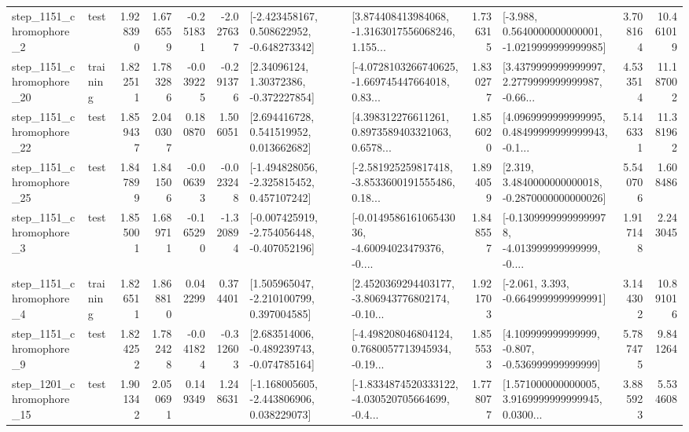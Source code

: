\begin{tabular}{llrrrrllrlrr}
  step\_1151\_chromophore\_2 &      test &      1.928390 &    1.676559 &     -0.251831 & -2.027637 &   [-2.423458167, 0.508622952, -0.648273342] &  [3.874408413984068, -1.3163017556068246, 1.155... &       1.736315 &  [-3.988, 0.5640000000000001, -1.0219999999999985] &            3.708164 &         10.461019 \\
 step\_1151\_chromophore\_20 &  training &      1.822511 &    1.783286 &     -0.039225 & -0.291376 &      [2.34096124, 1.30372386, -0.372227854] &  [-4.0728103266740625, -1.669745447664018, 0.83... &       1.830277 &  [3.4379999999999997, 2.2779999999999987, -0.66... &            4.533514 &         11.187002 \\
 step\_1151\_chromophore\_22 &      test &      1.859437 &    2.040307 &      0.180870 &  1.506051 &     [2.694416728, 0.541519952, 0.013662682] &  [4.398312276611261, 0.8973589403321063, 0.6578... &       1.856020 &  [4.0969999999999995, 0.48499999999999943, -0.1... &            5.146331 &         11.381962 \\
 step\_1151\_chromophore\_25 &      test &      1.847899 &    1.841506 &     -0.006393 & -0.023248 &   [-1.494828056, -2.325815452, 0.457107242] &  [-2.581925259817418, -3.8533600191555486, 0.18... &       1.894059 &   [2.319, 3.4840000000000018, -0.2870000000000026] &            5.540706 &          1.608486 \\
  step\_1151\_chromophore\_3 &      test &      1.855001 &    1.689711 &     -0.165290 & -1.320894 &  [-0.007425919, -2.754056448, -0.407052196] &  [-0.014958616106543036, -4.60094023479376, -0.... &       1.848557 &  [-0.13099999999999978, -4.013999999999999, -0.... &            1.917148 &          2.243045 \\
  step\_1151\_chromophore\_4 &  training &      1.826511 &    1.868810 &      0.042299 &  0.374401 &    [1.505965047, -2.210100799, 0.397004585] &  [2.4520369294403177, -3.806943776802174, -0.10... &       1.921703 &               [-2.061, 3.393, -0.6649999999999991] &            3.144302 &         10.891016 \\
  step\_1151\_chromophore\_9 &      test &      1.824252 &    1.782428 &     -0.041824 & -0.312603 &   [2.683514006, -0.489239743, -0.074785164] &  [-4.498208046804124, 0.7680057713945934, -0.19... &       1.855533 &    [4.109999999999999, -0.807, -0.536999999999999] &            5.787475 &          9.841264 \\
 step\_1201\_chromophore\_15 &      test &      1.901342 &    2.050691 &      0.149349 &  1.248631 &   [-1.168005605, -2.443806906, 0.038229073] &  [-1.8334874520333122, -4.030520705664699, -0.4... &       1.778077 &  [1.571000000000005, 3.9169999999999945, 0.0300... &            3.885923 &          5.534608 \\

\end{tabular}
